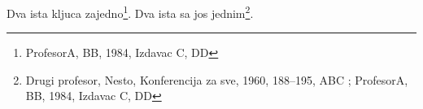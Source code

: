 \documentclass{article}
\begin{document}
Dva ista kljuca zajedno\footnote{ProfesorA, BB, 1984, Izdavac C, DD}.
Dva ista sa jos jednim\footnote{Drugi profesor, Nesto, Konferencija za sve, 1960, 188--195, ABC ; ProfesorA, BB, 1984, Izdavac C, DD}.
\end{document}
